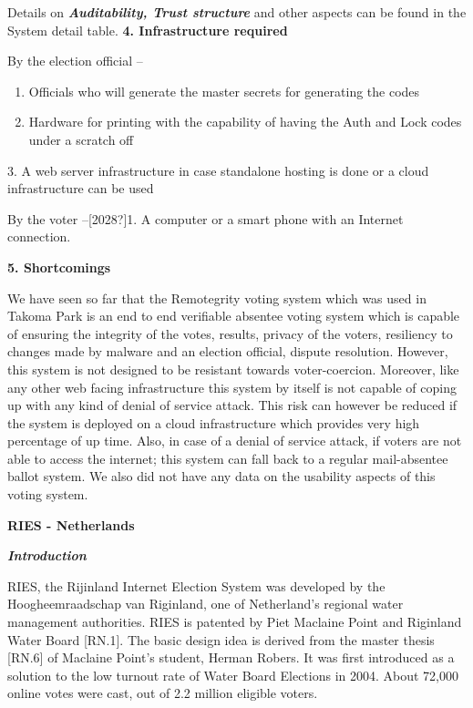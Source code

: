 Details on \textbf{\textit{Auditability, Trust structure }}and other aspects can be found in the System detail table. \textbf{4. Infrastructure required}

By the election official --

\begin{enumerate}
\item Officials who will generate the master secrets for generating the codes
\item Hardware for printing with the capability of having the Auth and Lock codes under a scratch off
\end{enumerate}
3. A web server infrastructure in case standalone hosting is done or a cloud infrastructure can be used

By the voter --[2028?]1. A computer or a smart phone with an Internet connection.

\textbf{5. Shortcomings}

We have seen so far that the Remotegrity voting system which was used in Takoma Park is an end to end verifiable absentee voting system which is capable of ensuring the integrity of the votes, results, privacy of the voters, resiliency to changes made by malware and an election official, dispute resolution. However, this system is not designed to be resistant towards voter-coercion. Moreover, like any other web facing infrastructure this system by itself is not capable of coping up with any kind of denial of service attack. This risk can however be reduced if the system is deployed on a cloud infrastructure which provides very high percentage of up time. Also, in case of a denial of service attack, if voters are not able to access the internet; this system can fall back to a regular mail-absentee ballot system. We also did not have any data on the usability aspects of this voting system.

\textbf{RIES - Netherlands}

\textbf{\textit{Introduction}}

RIES, the Rijinland Internet Election System was developed by the Hoogheemraadschap van Riginland, one of Netherland's regional water management authorities. RIES is patented by Piet Maclaine Point and Riginland Water Board [RN.1]. The basic design idea is derived from the master thesis [RN.6] of Maclaine Point's student, Herman Robers. It was first introduced as a solution to the low turnout rate of Water Board Elections in 2004. About 72,000 online votes were cast, out of 2.2 million eligible voters.

